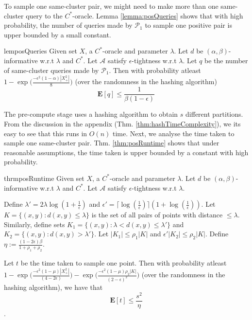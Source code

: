 \documentclass[12pt]{article}
\newcommand{\mb}{\mathbf}
\newcommand{\mc}{\mathcal}
\begin{document}
To sample one same-cluster pair, we might need to make more than one same-cluster query to the $C^*$-oracle. Lemma \ref{lemma:posQueries} shows that with high probability, the number of queries made by $\mc P_{1}$ to sample one positive pair is upper bounded by a small constant. 

\begin{restatable}{lem}{posQueries}
\label{lemma:posQueries}
Given set $X$, a $C^*$-oracle and parameter $\lambda$. Let $d$ be $(\alpha, \beta)$-informative w.r.t $\lambda$ and $C^*$. Let $\mc A$ satisfy $\epsilon$-tightness w.r.t $\lambda$. Let $q$ be the number of same-cluster queries made by $\mc P_1$. Then with probability atleast $1-\exp\big(\frac{-\epsilon^2(1-\alpha)|X^2_+|}{8}\big)$ (over the randomness in the hashing algorithm) $$\mb E[q] \le \frac{1}{\beta(1-\epsilon)}$$ 
\end{restatable}

The pre-compute stage uses a hashing algorithm to obtain $s$ different partitions. From the discussion in the appendix (Thm. \ref{thm:hashTimeComplexity}), we its easy to see that this runs in $O(n)$ time. Next, we  analyse the time taken to sample one same-cluster pair.  Thm. \ref{thm:posRuntime} shows that under reasonable assumptions, the time taken is upper bounded by a constant with high probability. 

\begin{restatable}{thrm}{posRuntime}
\label{thm:posRuntime}
Given set $X$, a $C^*$-oracle and parameter $\lambda$. Let $d$ be $(\alpha, \beta)$-informative w.r.t $\lambda$ and $C^*$. Let $\mc A$ satisfy $\epsilon$-tightness w.r.t $\lambda$. 

Define $\lambda' = 2\lambda\log(1+\frac{1}{\epsilon})$ and $\epsilon' = \lceil \log(\frac{1}{\epsilon})\rceil (1+\log(\frac{1}{\epsilon}))$. Let $K = \{(x, y) : d(x, y) \le \lambda\}$ is the set of all pairs of points with distance $\le \lambda$. Similarly, define sets $K_1 = \{(x, y): \lambda < d(x, y) \le \lambda'\}$ and $K_2 = \{(x, y): d(x, y) > \lambda'\}$. Let $|K_1| \le \rho_1|K|$ and $\epsilon'|K_2| \le \rho_2|K|$. Define $\eta := \frac{(1-2\epsilon)\beta}{1+\rho_1+\rho_2}$.

Let $t$ be the time taken to sample one point. Then with probability atleast $1- \exp\Big(\frac{- \epsilon^2 (1-\mu)|X^2_+|}{(4-2\epsilon)}\Big)- \exp\Big(\frac{-\epsilon^2(1-\mu)\rho_2 |K|}{(2-\epsilon)^2}\Big)$ (over the randomness in the hashing algorithm), we have that $$\mb E[t] \le \frac{s^2}{\eta}$$. 
\end{restatable}
\end{document}
